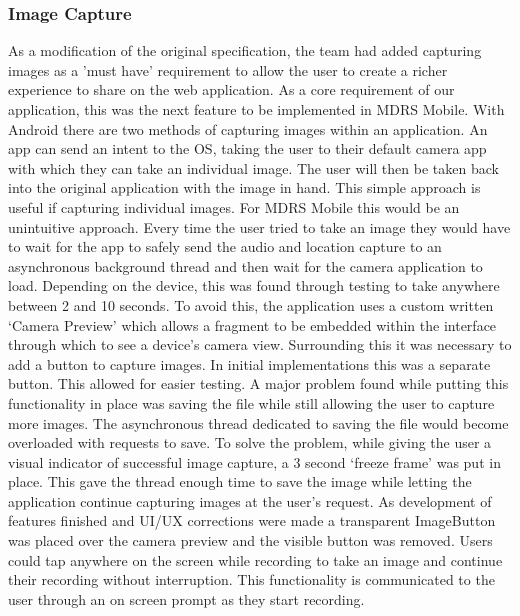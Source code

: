 \documentclass{l3proj}
\begin{document}
\subsubsection{Image Capture}
As a modification of the original specification, the team had added capturing images as a 'must have' requirement to allow the user to create a richer experience to share on the web application. As a core requirement of our application, this was the next feature to be implemented in MDRS Mobile. With Android there are two methods of capturing images within an application. An app can send an intent to the OS, taking the user to their default camera app with which they can take an individual image. The user will then be taken back into the original application with the image in hand. This simple approach is useful if capturing individual images. For MDRS Mobile this would be an unintuitive approach. Every time the user tried to take an image they would have to wait for the app to safely send the audio and location capture to an asynchronous background thread and then wait for the camera application to load. Depending on the device, this was found through testing to take anywhere between 2 and 10 seconds. To avoid this, the application uses a custom written ‘Camera Preview’ which allows a fragment to be embedded within the interface through which to see a device’s camera view. Surrounding this it was necessary to add a button to capture images. In initial implementations this was a separate button. This allowed for easier testing. A major problem found while putting this functionality in place was saving the file while still allowing the user to capture more images. The asynchronous thread dedicated to saving the file would become overloaded with requests to save. To solve the problem, while giving the user a visual indicator of successful image capture, a 3 second ‘freeze frame’ was put in place. This gave the thread enough time to save the image while letting the application continue capturing images at the user's request. As development of features finished and UI/UX corrections were made a transparent ImageButton was placed over the camera preview and the visible button was removed. Users could tap anywhere on the screen while recording to take an image and continue their recording without interruption. This functionality is communicated to the user through an on screen prompt as they start recording.
\end{document}
